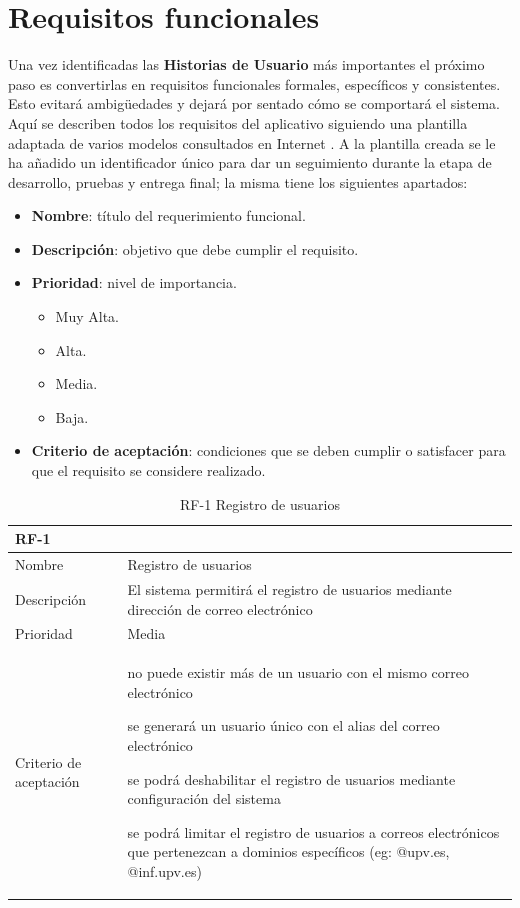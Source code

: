 \documentclass[11pt,spanish,listoffigures,listoftables]{tfgetsinf}
\begin{document}
\section{Requisitos funcionales}

Una vez identificadas las \textbf{Historias de Usuario} más importantes el próximo paso es convertirlas en requisitos funcionales formales, específicos y consistentes. Esto evitará ambigüedades y dejará por sentado cómo se comportará el sistema. Aquí se describen todos los requisitos del aplicativo siguiendo una plantilla adaptada de varios modelos consultados en Internet \cite{link-esp-rq-jan}. A la plantilla creada se le ha añadido un identificador único para dar un seguimiento durante la etapa de desarrollo, pruebas y entrega final; la misma tiene los siguientes apartados:

\begin{itemize}
	\item \textbf{Nombre}: título del requerimiento funcional.
	\item \textbf{Descripción}: objetivo que debe cumplir el requisito.
	\item \textbf{Prioridad}: nivel de importancia. 
	\begin{itemize}
		\item Muy Alta.
		\item Alta.
		\item Media.
		\item Baja.
	\end{itemize}
	
	\item \textbf{Criterio de aceptación}: condiciones que se deben cumplir o satisfacer para que el requisito se considere realizado.
\end{itemize}

\begin{table}[!ht]
	\centering
	\begin{tabular}{ |p{4cm}||p{10cm}|  }
		\multicolumn{2}{l}{\textbf{RF-1}} \\
		\hline
		Nombre & Registro de usuarios\\
		\hline
		Descripción & El sistema permitirá el registro de usuarios mediante dirección de correo electrónico   \\
		\hline
		Prioridad & Media\\
		\hline
		Criterio de aceptación & 
		\begin{tabitem}
			\item no puede existir más de un usuario con el mismo correo electrónico
			\item se generará un usuario único con el alias del correo electrónico
			\item se podrá deshabilitar el registro de usuarios mediante configuración del sistema
			\item se podrá limitar el registro de usuarios a correos electrónicos que pertenezcan a dominios específicos (eg: @upv.es, @inf.upv.es)
		\end{tabitem} \\
		\hline
	\end{tabular}
	\caption{RF-1 Registro de usuarios}
	\label{table:1}
\end{table}
\end{document}
